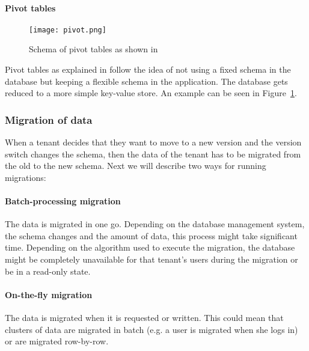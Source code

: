 %

\paragraph{Pivot tables}

\begin{figure}
\centering
\texttt{[image: pivot.png]}
\caption{Schema of pivot tables as shown in \cite{Yaish2011}}
\label{fig:pivot}
\end{figure}

Pivot tables as explained in \cite{Yaish2011} \cite{Aulbach2011} \cite{Weissman2009} follow the idea of not using a fixed schema in the database but keeping a flexible schema in the application. The database gets reduced to a more simple key-value store. An example can be seen in Figure~\ref{fig:pivot}.

\subsubsection{Migration of data}

When a tenant decides that they want to move to a new version and the version switch changes the schema, then the data of the tenant has to be migrated from the old to the new schema. Next we will describe two ways for running migrations:

\paragraph{Batch-processing migration} The data is migrated in one go. Depending on the database management system, the schema changes and the amount of data, this process might take significant time. Depending on the algorithm used to execute the migration, the database might be completely unavailable for that tenant's users during the migration or be in a read-only state.

\paragraph{On-the-fly migration} The data is migrated when it is requested or written. This could mean that clusters of data are migrated in batch (e.g. a user is migrated when she logs in) or are migrated row-by-row.

